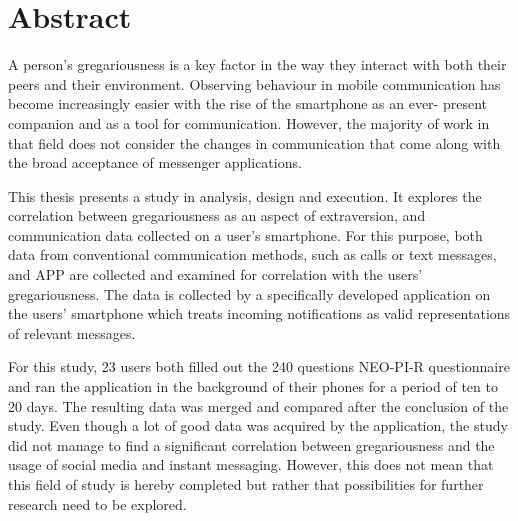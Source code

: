 
\chapter*{Abstract}
\label{ch:Abstract}

A person’s gregariousness is a key factor in the way they interact with both their peers and their environment. 
Observing behaviour in mobile communication has become increasingly easier with the rise of the smartphone as an ever- present companion and as a tool for communication. 
However, the majority of work in that field does not consider the changes in communication that come along with the broad acceptance of messenger applications.
\par
This thesis presents a study in analysis, design and execution. 
It explores the correlation between gregariousness as an aspect of extraversion, and communication data collected on a user's smartphone. 
For this purpose, both data from conventional communication methods, such as calls or text messages, and APP are collected and examined for correlation with the users’ gregariousness. 
The data is collected by a specifically developed application on the users’ smartphone which treats incoming notifications as valid representations of relevant messages.
\par
For this study, 23 users both filled out the 240 questions NEO-PI-R questionnaire and ran the application in the background of their phones for a period of ten to 20 days. The resulting data was merged and compared after the conclusion of the study. 
Even though a lot of good data was acquired by the application, the study did not manage to find a significant correlation between gregariousness and the usage of social media and instant messaging. 
However, this does not mean that this field of study is hereby completed but rather that possibilities for further research need to be explored.






